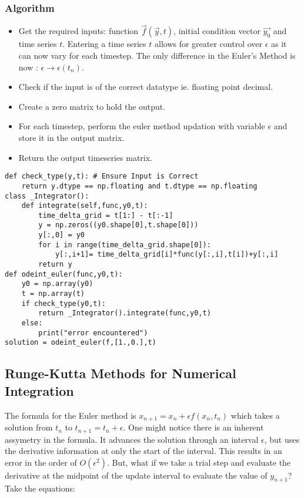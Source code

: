 \documentclass[10pt,letterpaper]{article}
\begin{document}
\subsubsection*{Algorithm}

\begin{itemize}
\item Get the required inputs: function $\vec{f}(\vec{y},t)$, initial condition vector $\vec{y_0}$ and time series $t$. Entering a time series $t$ allows for greater control over $\epsilon$ as it can now vary for each timestep. The only difference in the Euler's Method is now : $\epsilon\rightarrow\epsilon(t_n)$.
\item Check if the input is of the correct datatype ie. floating point decimal.
\item Create a zero matrix to hold the output.
\item For each timestep, perform the euler method updation with variable $\epsilon$ and store it in the output matrix.
\item Return the output timeseries matrix.
\end{itemize}

\begin{verbatim}
def check_type(y,t): # Ensure Input is Correct
    return y.dtype == np.floating and t.dtype == np.floating
class _Integrator():
    def integrate(self,func,y0,t):
        time_delta_grid = t[1:] - t[:-1]
        y = np.zeros((y0.shape[0],t.shape[0]))
        y[:,0] = y0
        for i in range(time_delta_grid.shape[0]):
            y[:,i+1]= time_delta_grid[i]*func(y[:,i],t[i])+y[:,i]
        return y
def odeint_euler(func,y0,t):
    y0 = np.array(y0)
    t = np.array(t)
    if check_type(y0,t):
        return _Integrator().integrate(func,y0,t)
    else:
        print("error encountered")
solution = odeint_euler(f,[1.,0.],t)
\end{verbatim}

\subsection*{Runge-Kutta Methods for Numerical Integration}

The formula for the Euler method is $x_{n+1}=x_n + \epsilon f(x_n,t_n)$ which takes a solution from $t_n$ to $t_{n+1}=t_n+\epsilon$. One might notice there is an inherent assymetry in the formula. It advances the solution through an interval $\epsilon$, but uses the derivative information at only the start of the interval. This results in an error in the order of $O(\epsilon^2)$. But, what if we take a trial step and evaluate the derivative at the midpoint of the update interval to evaluate the value of $y_{n+1}$? Take the equations:
\end{document}
